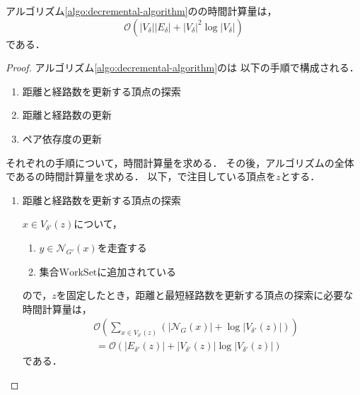 \begin{lemma}
  アルゴリズム\ref{algo:decremental-algorithm}のの時間計算量は，
  \[ \mathcal{O}(\lvert V_\delta\rvert\lvert E_\delta\rvert
  +\lvert V_\delta\rvert^2\log \lvert V_\delta\rvert) \]
  である．
\end{lemma}
\begin{proof}
  アルゴリズム\ref{algo:decremental-algorithm}のは
  以下の手順で構成される．
  \begin{enumerate}[label=(\alph*)]
  \item 距離と経路数を更新する頂点の探索
  \item 距離と経路数の更新
  \item ペア依存度の更新
  \end{enumerate}
  それぞれの手順について，時間計算量を求める．
  その後，アルゴリズムの全体であるの時間計算量を求める．
  以下，で注目している頂点を$z$とする．

  \begin{enumerate}[label=(\alph*)]
  \item 距離と経路数を更新する頂点の探索
    \par $x\in V_{\delta'}(z)$について，
    \begin{enumerate}[label=\arabic*.]
    \item $y\in\mathcal{N}_{G'}(x)$を走査する
    \item 集合$\text{WorkSet}$に追加されている
    \end{enumerate}
    ので，$z$を固定したとき，距離と最短経路数を更新する頂点の探索に必要な時間計算量は，
    \begin{equation}
      \begin{aligned}
        &\mathcal{O}(\sum_{x\in V_{\delta'}(z)}(\lvert\mathcal{N}_G(x)\rvert
        +\log\lvert V_{\delta'}(z)\rvert)) \nonumber\\
        &\:=\mathcal{O}(\lvert E_{\delta'}(z)\rvert
        +\lvert V_{\delta'}(z)\rvert\log\lvert V_{\delta'}(z)\rvert) \nonumber
      \end{aligned}
    \end{equation}
    である．


\end{enumerate}
\end{proof}
